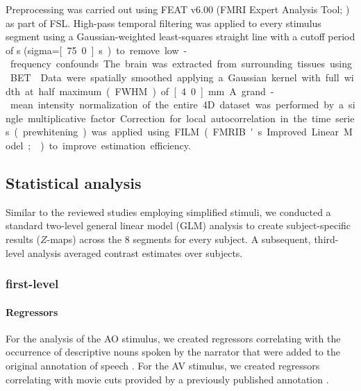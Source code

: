 \documentclass[english]{article}
\begin{document}
Preprocessing was carried out using FEAT v6.00 (FMRI Expert Analysis Tool;
\citep{woolrich2001autocorr}) as part of FSL.
High-pass temporal filtering was applied to every stimulus segment using a
Gaussian-weighted least-squares straight line with a cutoff period of
\unit[150]{s} (sigma=\unit[75.0]{s}) to remove low-frequency confounds.
The brain was extracted from surrounding tissues using BET \citep{smith2002bet}.
Data were spatially smoothed applying a Gaussian kernel with full width at half
maximum (FWHM) of \unit[4.0]{mm}.
A grand-mean intensity normalization of the entire 4D dataset was performed by a
single multiplicative factor.
Correction for local autocorrelation in the time series (prewhitening) was
applied using FILM (FMRIB's Improved Linear Model; \citep{woolrich2001autocorr})
to improve estimation efficiency.

\subsection{Statistical analysis}

Similar to the reviewed studies employing simplified stimuli, we conducted a
standard two-level general linear model (GLM) analysis to create
subject-specific results ($Z$-maps) across the 8 segments for every subject. A
subsequent, third-level analysis averaged contrast estimates over subjects.


\subsubsection{first-level}

\paragraph{Regressors}


For the analysis of the AO stimulus, we created regressors correlating with the
occurrence of descriptive nouns spoken by the narrator that were added to the
original annotation of speech \citep{haeusler2020speechanno}.
For the AV stimulus, we created regressors correlating with movie cuts provided
by a previously published annotation \citep{haeusler2016cutanno}.
\end{document}
